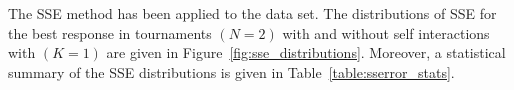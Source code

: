 The SSE method has been applied to the data set. The distributions of SSE for
the best response in tournaments \((N = 2)\) with and without self interactions
with \((K = 1)\) are given in Figure~\ref{fig:sse_distributions}. Moreover, a
statistical summary of the SSE distributions is given in
Table~\ref{table:sserror_stats}.

\begin{table}[!htbp]
    \begin{center}
    \end{center}
    \caption{SSE of best response memory-one when \(N=2\)}\label{table:sserror_stats}
\end{table}

